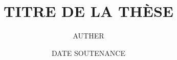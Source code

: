 \documentclass{book}
\title{TITRE DE LA THÈSE}
\author{AUTHER}
\date{DATE SOUTENANCE}
\begin{document}
\begin{titlepage}

	\newcommand{\specialite}{\MakeUppercase{SPÉCIALITÉ}}
	\newcommand{\nomEtab}{l'INSTITUTION} 		%
	\newcommand{\titreThese}{TITRE THÈSE}
	\newcommand{\nomAuteurice}{Prénom \MakeUppercase{NOM}}
	\newcommand{\dateSoutenance}{DATE}					%
	
	\newcommand{\prefixeUn}{M./Mme}
	\newcommand{\nomJuryUn}{PREMIER MEMBRE}
	\newcommand{\titreJuryUn}{AFFILIATION}
	\newcommand{\roleJuryUn}{RÔLE}
	
	\newcommand{\prefixeDeux}{Mme/M.}
	\newcommand{\nomJuryDeux}{DEUXIÈME MEMBRE}
	\newcommand{\titreJuryDeux}{AFFILIATION PLUS LONGUE POUR FAIRE AU MOINS DEUX LIGNES}
	\newcommand{\roleJuryDeux}{RÔLE}
	
	\newcommand{\prefixeTrois}{}
	\newcommand{\nomJuryTrois}{}
	\newcommand{\titreJuryTrois}{}
	\newcommand{\roleJuryTrois}{}
	
	\newcommand{\prefixeQuatre}{}
	\newcommand{\nomJuryQuatre}{}
	\newcommand{\titreJuryQuatre}{}
	\newcommand{\roleJuryQuatre}{}
	
	\newcommand{\prefixeCinq}{}
	\newcommand{\nomJuryCinq}{}
	\newcommand{\titreJuryCinq}{}
	\newcommand{\roleJuryCinq}{}
	
	\newcommand{\prefixeSix}{}
	\newcommand{\nomJurySix}{}
	\newcommand{\titreJurySix}{}
	\newcommand{\roleJurySix}{}
	
	\newcommand{\prefixeSept}{}
	\newcommand{\nomJurySept}{}
	\newcommand{\titreJurySept}{}
	\newcommand{\roleJurySept}{}
	
	\newcommand{\prefixeHuit}{}
	\newcommand{\nomJuryHuit}{}
	\newcommand{\titreJuryHuit}{}
	\newcommand{\roleJuryHuit}{}
	
	\newcommand{\prefixeNeuf}{}
	\newcommand{\nomJuryNeuf}{}
	\newcommand{\titreJuryNeuf}{}
	\newcommand{\roleJuryNeuf}{}
	
	\newcommand{\nombreMembreJury}{3}
	
	\newcommand{\nomDirecteurUn}{Directeur DE THESE}
	\newcommand{\nomDirecteurDeux}{}
	\newcommand{\nomDirecteurTrois}{}
	
	\newcommand{\nombreDirecteurs}{1}
	
	\newcommand{\nomLabo}{NOM DU LABO (VILLE)}
	
	\droidsans							%
										

\end{titlepage}
\end{document}
